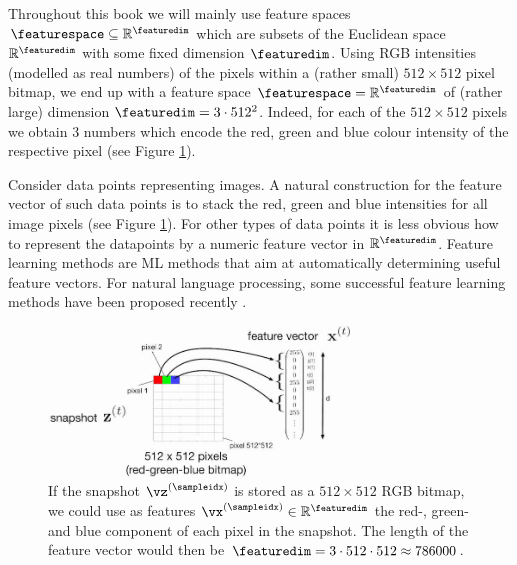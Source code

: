 \documentclass[12pt]{report}
\newcommand{\featurelen}{\featuredim}
\begin{document}
Throughout this book we will mainly use feature spaces $\featurespace \subseteq \mathbb{R}^{\featuredim}$ 
which are subsets of the Euclidean space $\mathbb{R}^{\featuredim}$ with some fixed dimension $\featuredim$. 
Using RGB intensities (modelled as real numbers) of the pixels within a (rather small) $512 \times 512$ pixel bitmap, 
we end up with a feature space $\featurespace=\mathbb{R}^{\featuredim}$ of (rather large) dimension 
$\featuredim = 3 \cdot 512^2$. Indeed, for each of the $512 \times 512$ pixels we obtain $3$ numbers which 
encode the red, green and blue colour intensity of the respective pixel (see Figure \ref{fig_snapshot_pixels}). 

Consider data points representing images. A natural construction for the feature vector of such data points 
is to stack the red, green and blue intensities for all image pixels (see Figure \ref{fig_snapshot_pixels}). For other 
types of data points it is less obvious how to represent the datapoints by a numeric feature vector in $\mathbb{R}^{\featurelen}$. 
Feature learning methods are ML methods that aim at automatically determining useful feature vectors. For 
natural language processing, some successful feature learning methods have been proposed recently \cite{Mikolov2013}. 



\begin{figure}[htbp]
	\begin{center}
		\includegraphics[width=8cm]{RumbaSnapshotFeature1.jpg}  
	\end{center}
	\caption{If the snapshot $\vz^{(\sampleidx)}$ is stored as a $512 \times 512$ RGB bitmap, we could use as 
		features $\vx^{(\sampleidx)} \in \mathbb{R}^{\featuredim}$ the red-, green- and blue component of each pixel 
		in the snapshot. The length of the feature vector would then be $\featuredim= 3 \cdot 512 \cdot 512 \approx 786000$. }
	\label{fig_snapshot_pixels}
\end{figure}

\end{document}
